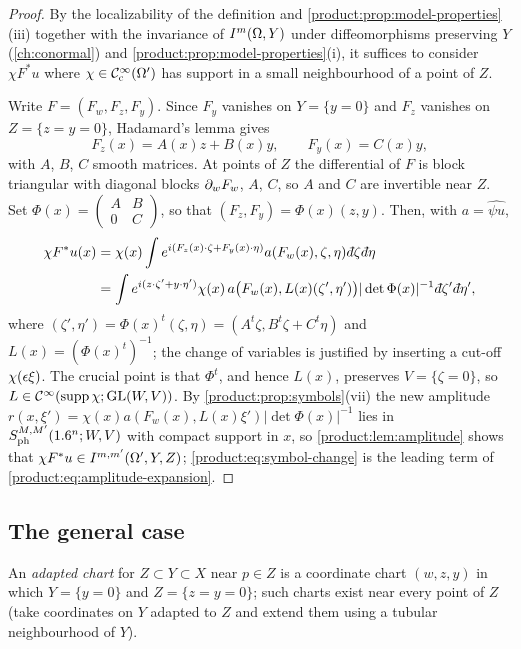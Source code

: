 \begin{proof}
By the localizability of the definition and \cref{product:prop:model-properties}(iii)
together with the invariance of $I^{m}(\Omega,Y)$ under diffeomorphisms preserving
$Y$ (\cref{ch:conormal}) and \cref{product:prop:model-properties}(i), it suffices to
consider $\chi F^*u$ where $\chi\in\mathcal{C}^\infty_{\mathrm{c}}(\Omega')$ has support in a small
neighbourhood of a point of $Z$.

Write $F=(F_w,F_z,F_y)$. Since $F_y$ vanishes on $Y=\{y=0\}$ and $F_z$ vanishes
on $Z=\{z=y=0\}$, Hadamard's lemma gives
\begin{equation*}
F_z(x)=A(x)z+B(x)y,\qquad F_y(x)=C(x)y,
\end{equation*}
with $A$, $B$, $C$ smooth matrices. At points of $Z$ the differential of $F$ is
block triangular with diagonal blocks $\partial_wF_w$, $A$, $C$, so $A$ and $C$ are
invertible near $Z$. Set $\Phi(x)=\begin{pmatrix}A&B\\0&C\end{pmatrix}$, so that
$(F_z,F_y)=\Phi(x)(z,y)$. Then, with $a=\widehat{\psi u}$,
\begin{align*}
\chi F^*u(x)&=\chi(x)\int e^{i(F_z(x)\cdot\zeta+F_y(x)\cdot\eta)}a(F_w(x),\zeta,\eta)
\,\dbar\zeta\,\dbar\eta\\
&=\int e^{i(z\cdot\zeta'+y\cdot\eta')}\chi(x)\,a\big(F_w(x),L(x)(\zeta',\eta')\big)
|\det\Phi(x)|^{-1}\,\dbar\zeta'\,\dbar\eta',
\end{align*}
where $(\zeta',\eta')=\Phi(x)^t(\zeta,\eta)=(A^t\zeta,B^t\zeta+C^t\eta)$ and
$L(x)=(\Phi(x)^t)^{-1}$; the change of variables is justified by inserting a
cut-off $\chi(\epsilon\xi)$. The crucial point is that $\Phi^t$, and hence $L(x)$,
preserves $V=\{\zeta=0\}$, so $L\in\mathcal{C}^\infty(\operatorname{supp}\chi;\operatorname{GL}(W,V))$. By
\cref{product:prop:symbols}(vii) the new amplitude
$r(x,\xi')=\chi(x)a(F_w(x),L(x)\xi')|\det\Phi(x)|^{-1}$ lies in
$S^{M,M'}_{\mathrm{ph}}(1.6^n;W,V)$ with compact support in $x$, so
\cref{product:lem:amplitude} shows that $\chi F^*u\in I^{m,m'}(\Omega',Y,Z)$;
\eqref{product:eq:symbol-change} is the leading term of
\eqref{product:eq:amplitude-expansion}.
\end{proof}

\subsection{The general case}
An \emph{adapted chart} for $Z\subset Y\subset X$ near $p\in Z$ is a coordinate
chart $(w,z,y)$ in which $Y=\{y=0\}$ and $Z=\{z=y=0\}$; such charts exist near
every point of $Z$ (take coordinates on $Y$ adapted to $Z$ and extend them using a
tubular neighbourhood of $Y$).

